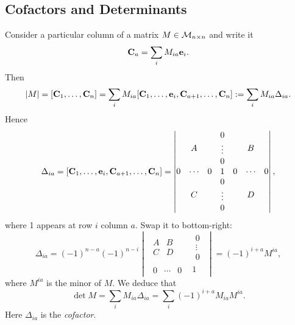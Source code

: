 \documentclass[10pt]{article}
\begin{document}
    \subsection{Cofactors and Determinants}
    Consider a particular column of a matrix $ M\in {\mathcal{M}}_{n\times n} $ and write it 
    \[
        {\bf C}_a=\sum_{i}M_{ia}{\bf e}_i
    .\]
    Then 
    \[
        |M|=[{\bf C}_1,\dots,{\bf C}_n]=\sum_{i}M_{ia}[{\bf C}_1,\dots,{\bf e}_i,{\bf C}_{a+1},\dots,{\bf C}_n]:= \sum_i M_{ia}\Delta_{ia}
    .\]
    Hence
    \[
        \Delta_{ia}=[{\bf C}_1,\dots,{\bf e}_i,{\bf C}_{a+1},\dots,{\bf C}_n]=\begin{vmatrix}
            A & \begin{matrix}
                0\\ \vdots \\ 0
            \end{matrix} & B\\
            \begin{matrix}
                0 & \cdots & 0
            \end{matrix} & 1 &\begin{matrix}
                0 & \cdots & 0
            \end{matrix}\\
            C & \begin{matrix}
                0\\ \vdots \\ 0
            \end{matrix} & D
        \end{vmatrix}
    ,\]
    where 1 appears at row $i$ column $a$. Swap it to bottom-right:
    \[
        \Delta_{ia}=(-1)^{n-a}(-1)^{n-i}\begin{vmatrix}
            \begin{matrix}
                A&B\\C&D
            \end{matrix}&\begin{matrix}
                0\\ \vdots \\ 0
            \end{matrix}\\
            \begin{matrix}
                0 & \cdots & 0
            \end{matrix}&1
        \end{vmatrix}=(-1)^{i+a}M^{ia}
    ,\]
    where $ M^{ia} $ is the minor of $M$. We deduce that 
    \[
        \det M = \sum_{i} M_{ia}\Delta_{ia}=\sum_{i}(-1)^{i+a}M_{ia}M^{ia}
    .\]
    Here $\Delta_{ia}$ is the \textit{cofactor}.
\end{document}
